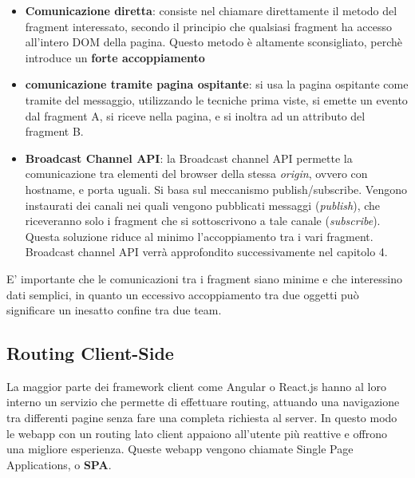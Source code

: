 \begin{itemize}
    \item \textbf{Comunicazione diretta}: consiste nel chiamare direttamente il metodo del fragment
    interessato, secondo il principio che qualsiasi fragment ha accesso all'intero DOM della pagina.
    Questo metodo è altamente sconsigliato, perchè introduce un \textbf{forte accoppiamento}
    \item \textbf{comunicazione tramite pagina ospitante}: si usa la pagina ospitante come tramite del messaggio,
    utilizzando le tecniche prima viste, si emette un evento dal fragment A, si riceve nella pagina, e si inoltra ad un attributo 
    del fragment B.
    \item \textbf{Broadcast Channel API}: la Broadcast channel API permette la comunicazione 
    tra elementi del browser della stessa \emph{origin}, ovvero con hostname, e porta uguali. 
    Si basa sul meccanismo publish/subscribe.
    Vengono instaurati dei canali nei quali vengono pubblicati messaggi (\emph{publish}), 
    che riceveranno solo i fragment che si sottoscrivono a tale canale (\emph{subscribe}).
    Questa soluzione riduce al minimo l'accoppiamento tra i vari fragment.
    Broadcast channel API verrà approfondito successivamente nel capitolo 4.
\end{itemize}
E' importante che le comunicazioni tra i fragment siano minime e che interessino dati semplici, in quanto
un eccessivo accoppiamento tra due oggetti può significare un inesatto confine tra due team.



\pagebreak
\subsection{Routing Client-Side }
La maggior parte dei framework client come Angular o React.js hanno al loro interno un servizio che permette di
effettuare routing, attuando una navigazione tra differenti pagine senza fare una completa richiesta al server.
In questo modo le webapp con un routing lato client appaiono all'utente più reattive e offrono una migliore esperienza.
Queste webapp vengono chiamate Single Page Applications, o \textbf{SPA}.

